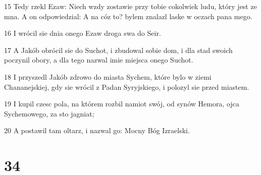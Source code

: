 \par 15 Tedy rzekl Ezaw: Niech wzdy zostawie przy tobie cokolwiek ludu, który jest ze mna. A on odpowiedzial: A na cóz to? bylem znalazl laske w oczach pana mego.
\par 16 I wrócil sie dnia onego Ezaw droga swa do Seir.
\par 17 A Jakób obrócil sie do Suchot, i zbudowal sobie dom, i dla stad swoich poczynil obory, a dla tego nazwal imie miejsca onego Suchot.
\par 18 I przyszedl Jakób zdrowo do miasta Sychem, które bylo w ziemi Chananejskiej, gdy sie wrócil z Padan Syryjskiego, i polozyl sie przed miastem.
\par 19 I kupil czesc pola, na którem rozbil namiot swój, od synów Hemora, ojca Sychemowego, za sto jagniat;
\par 20 A postawil tam oltarz, i nazwal go: Mocny Bóg Izraelski.

\chapter{34}

